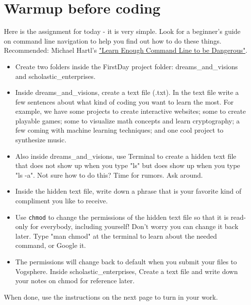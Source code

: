 \documentclass{42-en}
\begin{document}
\chapter{Warmup before coding}

Here is the assignment for today - it is very simple. Look for a beginner's guide on command line navigation to help you find out how to do these things. Recommended: Michael Hartl's \href{https://www.learnenough.com/command-line-tutorial}{"Learn Enough Command Line to be Dangerous"}.


\begin{itemize}

	\item Create two folders inside the FirstDay project folder: dreams\_and\_visions and scholastic\_enterprises.
	\item Inside dreams\_and\_visions, create a text file (.txt). In the text file write a few sentences about what kind of coding you want to learn the most. For example, we have some projects to create interactive websites; some to create playable games; some to visualize math concepts and learn cryptography; a few coming with machine learning techniques; and one cool project to synthesize music.
	\item Also inside dreams\_and\_visions, use Terminal to create a hidden text file that does not show up when you type "ls" but does show up when you type "ls -a". Not sure how to do this? Time for rumors. Ask around.
	\item Inside the hidden text file, write down a phrase that is your favorite kind of compliment you like to receive.
	\item Use \texttt{chmod} to change the permissions of the hidden text file so that it is read-only for everybody, including yourself! Don't worry you can change it back later. Type "man chmod" at the terminal to learn about the needed command, or Google it.
	\item The permissions will change back to default when you submit your files to Vogsphere. Inside scholastic\_enterprises, Create a text file and write down your notes on chmod for reference later.

\end{itemize}

When done, use the instructions on the next page to turn in your work.

\end{document}
